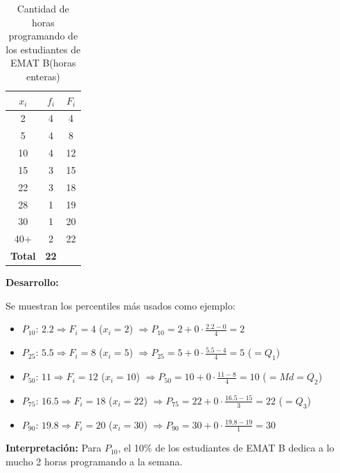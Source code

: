 \documentclass[12pt,letterpaper]{article}
\begin{document}
\begin{table}[H]
    \centering
    \caption{Cantidad de horas programando de los estudiantes de EMAT B(horas enteras)}
    \label{tab:mediana-cuantiles-horas}
    \begin{tabular}{@{}ccc@{}}
        \toprule
        $x_i$ & $f_i$ & $F_i$ \\
        \midrule
        2 & 4 & 4 \\
        5 & 4 & 8 \\
        10 & 4 & 12 \\
        15 & 3 & 15 \\
        22 & 3 & 18 \\
        28 & 1 & 19 \\
        30 & 1 & 20 \\
        40+ & 2 & 22 \\
        \midrule
        \textbf{Total} & \textbf{22} & \\
        \bottomrule
    \end{tabular}
\end{table}

\textbf{Desarrollo:}

Se muestran los percentiles más usados como ejemplo:
\begin{itemize}
    \item $P_{10}$: $2.2 \Rightarrow F_i=4$ ($x_i=2$) $\Rightarrow P_{10} = 2 + 0\cdot\frac{2.2-0}{4} = 2$
    \item $P_{25}$: $5.5 \Rightarrow F_i=8$ ($x_i=5$) $\Rightarrow P_{25} = 5 + 0\cdot\frac{5.5-4}{4} = 5$ \quad ($=Q_1$)
    \item $P_{50}$: $11 \Rightarrow F_i=12$ ($x_i=10$) $\Rightarrow P_{50} = 10 + 0\cdot\frac{11-8}{4} = 10$ \quad ($=Md=Q_2$)
    \item $P_{75}$: $16.5 \Rightarrow F_i=18$ ($x_i=22$) $\Rightarrow P_{75} = 22 + 0\cdot\frac{16.5-15}{3} = 22$ \quad ($=Q_3$)
    \item $P_{90}$: $19.8 \Rightarrow F_i=20$ ($x_i=30$) $\Rightarrow P_{90} = 30 + 0\cdot\frac{19.8-19}{1} = 30$
\end{itemize}

\textbf{Interpretación:} Para $P_{10}$, el 10\% de los estudiantes de EMAT B dedica a lo mucho 2 horas programando a la semana.
\end{document}
